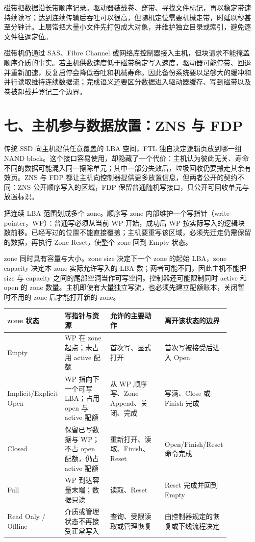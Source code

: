 
磁带把数据沿长带顺序记录。驱动器装载卷、穿带、寻找文件标记，再以稳定带速持续读写；达到连续传输后吞吐可以很高，但随机定位需要机械走带，时延以秒甚至分钟计。上层常把大量小文件先打包成大对象，并维护独立目录或索引，避免逐文件往返定位。

磁带机仍通过 SAS、Fibre Channel 或网络库控制器接入主机，但块请求不能掩盖顺序介质的事实。若主机供数速度低于磁带稳定写入速度，驱动器可能停带、回退并重新加速，反复启停会降低吞吐和机械寿命。因此备份系统要以足够大的缓冲和并行读取维持连续数据流；完成语义还要区分数据进入驱动器缓存、写到磁带以及卷被卸载并登记三个边界。
\section{七、主机参与数据放置：ZNS 与 FDP}

传统 SSD 向主机提供任意覆盖的 LBA 空间，FTL 独自决定逻辑页放到哪一组 NAND block。这个接口容易使用，却隐藏了一个代价：主机认为彼此无关、寿命不同的数据可能混入同一擦除单元；其中一部分失效后，垃圾回收仍要搬走其余有效页。ZNS 与 FDP 都让主机向控制器提供更多放置信息，但两者公开的契约不同：ZNS 公开顺序写入的区域，FDP 保留普通随机写接口，只公开可回收单元与放置标识。\cite{nvme-zns-fdp}


把连续 LBA 范围划成多个 zone。顺序写 zone 内部维护一个写指针（write pointer，WP）：普通写必须从当前 WP 开始，成功后 WP 按实际写入的逻辑块数前移。已经写过的位置不能直接覆盖；主机要重写该区域，必须先迁走仍需保留的数据，再执行 Zone Reset，使整个 zone 回到 Empty 状态。

zone 同时具有容量与大小。zone size 决定下一个 zone 的起始 LBA，zone capacity 决定本 zone 实际允许写入的 LBA 数；两者可能不同，因此主机不能把 size 与 capacity 之间的尾部空洞当作可写空间。控制器还可能限制同时 active 和 open 的 zone 数量。主机即使有大量独立写流，也必须先建立配额账本，关闭暂时不用的 zone 后才能打开新的 zone。

\begin{longtable}{L{0.18\linewidth}L{0.24\linewidth}L{0.28\linewidth}L{0.20\linewidth}}
\toprule
zone 状态 & 写指针与资源 & 允许的主要动作 & 离开该状态的边界 \\
\midrule
Empty & WP 在 zone 起点；未占用 active 配额 & 首次写、显式打开 & 首次写被接受后进入 Open \\\tablerowrule
Implicit/\allowbreak Explicit Open & WP 指向下一个可写 LBA；占用 open 与 active 配额 & 从 WP 顺序写、Zone Append、关闭、完成 & 写满、Close 或 Finish 完成 \\\tablerowrule
Closed & 保留已写数据与 WP；不占 open 配额，仍占 active 配额 & 重新打开、读取、Finish、Reset & Open/\allowbreak Finish/\allowbreak Reset 命令完成 \\\tablerowrule
Full & WP 到达容量末端；数据只读 & 读取、Reset & Reset 完成并回到 Empty \\\tablerowrule
Read Only / Offline & 介质或管理状态不再接受正常写入 & 查询、受限读取或管理恢复 & 由控制器规定的恢复或下线流程决定 \\
\bottomrule
\end{longtable}

